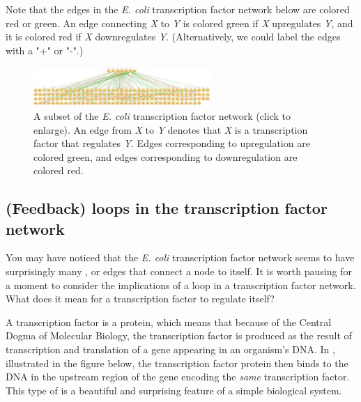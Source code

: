 Note that the edges in the \textit{E. coli} transcription factor network below are colored red or green. An edge connecting \textit{X} to \textit{Y} is colored green if \textit{X} upregulates \textit{Y}, and it is colored red if \textit{X} downregulates \textit{Y}. (Alternatively, we could label the edges with a "+" or "-".)

\begin{figure}[h]
\centering
\mySfFamily
\includegraphics[width = 0.6\textwidth]{../assets/images/600px/e_coli_tf_network.jpeg}
\caption{A subset of the \textit{E. coli} transcription factor network (click to enlarge). An edge from \textit{X} to \textit{Y} denotes that \textit{X} is a transcription factor that regulates \textit{Y}. Edges corresponding to upregulation are colored green, and edges corresponding to downregulation are colored red.}
\label{fig:e_coli_tf_network}
\end{figure}

\begin{qbox}\end{qbox} 

\FloatBarrier
{}
\subsection{(Feedback) loops in the transcription factor network}

You may have noticed that the \textit{E. coli} transcription factor network seems to have surprisingly many , or edges that connect a node to itself. It is worth pausing for a moment to consider the implications of a loop in a transcription factor network. What does it mean for a transcription factor to regulate itself?

A transcription factor is a protein, which means that because of the Central Dogma of Molecular Biology, the transcription factor is produced as the result of transcription and translation of a gene appearing in an organism's DNA. In , illustrated in the figure below, the transcription factor protein then binds to the DNA in the upstream region of the gene encoding the \textit{same} transcription factor. This type of  is a beautiful and surprising feature of a simple biological system.

